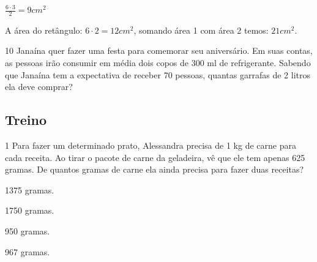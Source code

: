\begin{escolha}
\begin{escolha}
\begin{escolha}
\begin{escolha}
{\begin{boxmedio}
\begin{boxpeq}
\begin{q°}
\begin{boxmedio}
\begin{boxpeq}
\begin{boxpeq}
\begin{boxmedio}
\begin{boxmedio}
\begin{boxmedio}
\begin{largebox}
\begin{boxmedio}
{\begin{enumerate}
\begin{boxpeq}
{\begin{boxpeq}
\begin{boxpeq}
\begin{boxmedio}
\begin{boxpeq}
\begin{boxpeq}
\begin{boxpeq}
{\begin{boxpeq}
\begin{boxmedio}
{$\frac{6 \cdot 3}{2} = 9 cm^2$

A área do retângulo: $6 \cdot 2 = 12 cm^2$, somando área 1 com área 2 temos: $21
cm^2$.}

\num{10} Janaína quer fazer uma festa para comemorar seu aniversário. Em suas
contas, as pessoas irão consumir em média dois copos de 300 ml de refrigerante.
Sabendo que Janaína tem a expectativa de receber 70 pessoas, quantas garrafas de
2 litros ela deve comprar?

\begin{boxpeq}


\section{Treino}

\num{1} Para fazer um determinado prato, Alessandra precisa de 1 kg de carne
para cada receita. Ao tirar o pacote de carne da geladeira, vê que ele
tem apenas 625 gramas. De quantos gramas de carne ela ainda precisa para
fazer duas receitas?

\begin{escolha}

  \item 1375 gramas.

  \item 1750 gramas.

  \item 950 gramas.

  \item 967 gramas.

\end{escolha}



\end{boxpeq}
\end{boxmedio}
\end{boxpeq}}
\end{boxpeq}
\end{boxpeq}
\end{boxpeq}
\end{boxmedio}
\end{boxpeq}
\end{boxpeq}}
\end{boxpeq}
\end{enumerate}}
\end{boxmedio}
\end{largebox}
\end{boxmedio}
\end{boxmedio}
\end{boxmedio}
\end{boxpeq}
\end{boxpeq}
\end{boxmedio}
\end{q°}
\end{boxpeq}
\end{boxmedio}}
\end{escolha}
\end{escolha}
\end{escolha}
\end{escolha}
